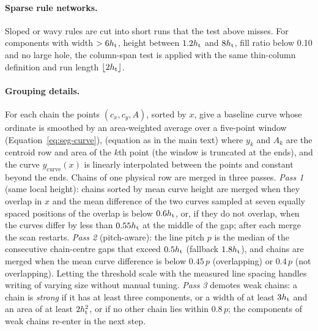 \paragraph{Sparse rule networks.}
Sloped or wavy rules are cut into short runs that the test above misses.
For components with width $>6h_{\mathrm{t}}$, height between $1.2h_{\mathrm{t}}$ and $8h_{\mathrm{t}}$, fill ratio below 0.10 and no large hole, the column-span test is applied with the same thin-column definition and run length $\lfloor2h_{\mathrm{t}}\rfloor$.


\paragraph{Grouping details.}
For each chain the points $(c_x,c_y,A)$, sorted by $x$, give a baseline curve whose ordinate is smoothed by an area-weighted average over a five-point window (Equation~\ref{eq:seg-curve}),
(equation as in the main text)
where $y_k$ and $A_k$ are the centroid row and area of the $k$th point (the window is truncated at the ends), and the curve $y_{\mathrm{curve}}(x)$ is linearly interpolated between the points and constant beyond the ends.
Chains of one physical row are merged in three passes.
\emph{Pass 1} (same local height): chains sorted by mean curve height are merged when they overlap in $x$ and the mean difference of the two curves sampled at seven equally spaced positions of the overlap is below $0.6h_{\mathrm{t}}$, or, if they do not overlap, when the curves differ by less than $0.55h_{\mathrm{t}}$ at the middle of the gap; after each merge the scan restarts.
\emph{Pass 2} (pitch-aware): the line pitch $p$ is the median of the consecutive chain-centre gaps that exceed $0.5h_{\mathrm{t}}$ (fallback $1.8h_{\mathrm{t}}$), and chains are merged when the mean curve difference is below $0.45\,p$ (overlapping) or $0.4\,p$ (not overlapping).
Letting the threshold scale with the measured line spacing handles writing of varying size without manual tuning.
\emph{Pass 3} demotes weak chains: a chain is \emph{strong} if it has at least three components, or a width of at least $3h_{\mathrm{t}}$ and an area of at least $2h_{\mathrm{t}}^2$, or if no other chain lies within $0.8\,p$; the components of weak chains re-enter in the next step.

